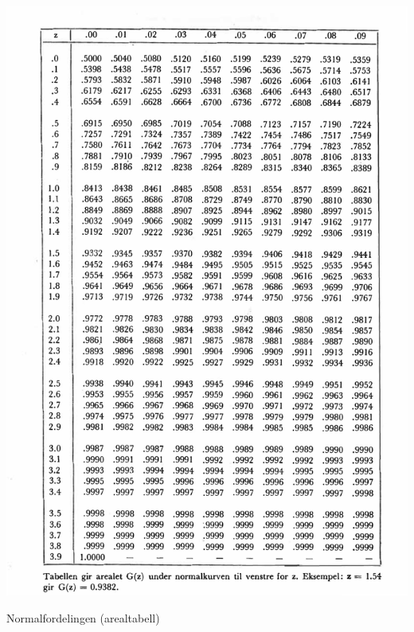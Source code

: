 \begin{table}[H]
\centering
  \includegraphics[scale=1.0]{figurer/Tabell_4a_Normal_Kurvenareal.pdf}
 \caption{Normalfordelingen (arealtabell)}
 \label{tab:Normal_Kurvenareal} %
\end{table}

